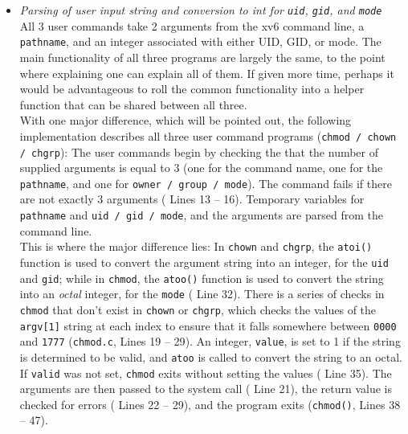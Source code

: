 \documentclass[11pt,letterpaper]{report}
\begin{document}
\begin{itemize}
		\item \emph{Parsing of user input string and conversion to int for {\tt uid}, {\tt gid}, and {\tt mode}}\\
		All 3 user commands take 2 arguments from the xv6 command line, a {\tt pathname}, and an integer associated with either UID, GID, or mode. The main functionality of all three programs are largely the same, to the point where explaining one can explain all of them. If given more time, perhaps it would be advantageous to roll the common functionality into a helper function that can be shared between all three.\\
		With one major difference, which will be pointed out, the following implementation describes all three user command programs ({\tt chmod / chown / chgrp}):
		The user commands begin by checking the that the number of supplied arguments is equal to 3 (one for the command name, one for the {\tt pathname}, and one for {\tt owner / group / mode}). The command fails if there are not exactly 3 arguments ({\color{red} Lines 13 -- 16}). Temporary variables for {\tt pathname} and {\tt uid / gid / mode}, and the arguments are parsed from the command line.\\
		This is where the major difference lies: In {\tt chown} and {\tt chgrp}, the {\tt atoi()} function is used to convert the argument string into an integer, for the {\tt uid} and {\tt gid}; while in {\tt chmod}, the {\tt atoo()} function is used to convert the string into an \emph{octal} integer, for the {\tt mode} ({\color{red} Line 32}). There is a series of checks in {\tt chmod} that don't exist in {\tt chown} or {\tt chgrp}, which checks the values of the {\tt argv[1]} string at each index to ensure that it falls somewhere between {\tt 0000} and {\tt 1777} ({\tt chmod.c}, {\color{red} Lines 19 -- 29}). An integer, {\tt value}, is set to 1 if the string is determined to be valid, and {\tt atoo} is called to convert the string to an octal. If {\tt valid} was not set, {\tt chmod} exits without setting the values ({\color{red} Line 35}).
		The arguments are then passed to the system call ({\color{red} Line 21}), the return value is checked for errors ({\color{red} Lines 22 -- 29}), and the program exits ({\tt chmod()}, {\color{red} Lines 38 -- 47}).
		
	\end{itemize}
	
\end{document}
